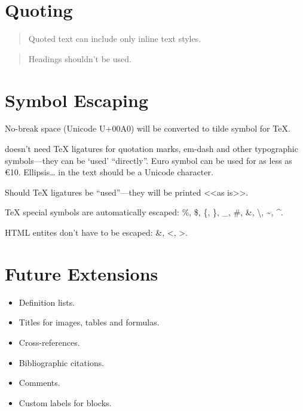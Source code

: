 \documentclass[10pt]{article}
\begin{document}
\section{Quoting}

\begin{quotation}
Quoted text can include only inline text styles.
\end{quotation}

\begin{quotation}
Headings shouldn’t be used.
\end{quotation}

\section{Symbol Escaping}

No-break space (Unicode U+00A0) will be converted to tilde symbol for TeX.

\XeTeX{} doesn't need \TeX{} ligatures for quotation marks, em-dash and other
typographic symbols—they can be ‘used’ “directly”. Euro symbol can be used for
as less as €10. Ellipsis… in the text should be a Unicode character.

Should \TeX{} ligatures be ``used''—they will be printed <<as is>>.

\TeX{} special symbols are automatically escaped: \%, \$, \{, \}, \_, \#,
\&, \textbackslash, \textasciitilde, \textasciicircum.

HTML entites don't have to be escaped: \&, <, >.

\section{Future Extensions}

\begin{itemize}

\item Definition lists.

\item Titles for images, tables and formulas.

\item Cross-references.

\item Bibliographic citations.

\item Comments.

\item Custom labels for blocks.

\end{itemize}
\end{document}
